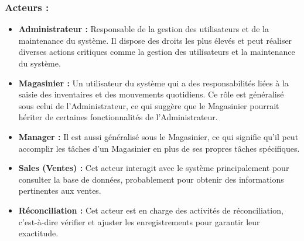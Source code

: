 \documentclass[a4paper, oneside, 12pt, final]{extreport}
\begin{document}
\subsubsection{Acteurs :}
\begin{itemize}
\item \textbf{Administrateur :} Responsable de la gestion des utilisateurs et de la maintenance du système. Il dispose des droits les plus élevés et peut réaliser diverses actions critiques comme la gestion des utilisateurs et la maintenance du système.

\item \textbf{Magasinier :} Un utilisateur du système qui a des responsabilités liées à la saisie des inventaires et des mouvements quotidiens. Ce rôle est généralisé sous celui de l'Administrateur, ce qui suggère que le Magasinier pourrait hériter de certaines fonctionnalités de l'Administrateur.
\item \textbf{Manager :} Il est aussi généralisé sous le Magasinier, ce qui signifie qu'il peut accomplir les tâches d'un Magasinier en plus de ses propres tâches spécifiques.
\item \textbf{Sales (Ventes) :} Cet acteur interagit avec le système principalement pour consulter la base de données, probablement pour obtenir des informations pertinentes aux ventes.
\item \textbf{Réconciliation :} Cet acteur est en charge des activités de réconciliation, c’est-à-dire vérifier et ajuster les enregistrements pour garantir leur exactitude.
\end{itemize}
\end{document}
